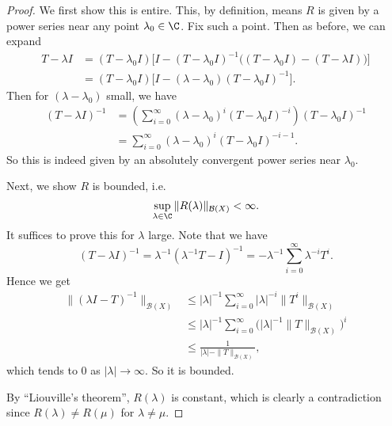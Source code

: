 \documentclass[a4paper]{article}
\begin{document}
\begin{proof}
  We first show this is entire. This, by definition, means $R$ is given by a power series near any point $\lambda_0 \in \C$. Fix such a point. Then as before, we can expand
  \begin{align*}
    T - \lambda I &= (T - \lambda_0 I)\Big[I - (T - \lambda_0 I)^{-1} \Big((T - \lambda_0 I) - (T - \lambda I)\Big)\Big]\\
    &= (T - \lambda_0 I)\Big[I - (\lambda - \lambda_0)(T - \lambda_0 I)^{-1}\Big].
  \end{align*}
  Then for $(\lambda - \lambda_0)$ small, we have
  \begin{align*}
    (T - \lambda I)^{-1} &= \left(\sum_{i = 0}^\infty (\lambda - \lambda_0)^i (T - \lambda_0 I)^{-i}\right) (T - \lambda_0 I)^{-1}\\
    &= \sum_{i = 0}^\infty (\lambda - \lambda_0)^i (T - \lambda_0I)^{-i - 1}.
  \end{align*}
  So this is indeed given by an absolutely convergent power series near $\lambda_0$.

  Next, we show $R$ is bounded, i.e.
  \[
    \sup_{\lambda \in \C} \|R (\lambda)\|_{\mathcal{B}(X)} < \infty.
  \]
  It suffices to prove this for $\lambda$ large. Note that we have
  \[
    (T - \lambda I)^{-1} = \lambda^{-1}(\lambda^{-1} T - I)^{-1} = -\lambda^{-1} \sum_{i = 0}^\infty \lambda^{-i} T^i.
  \]
  Hence we get
  \begin{align*}
    \|(\lambda I - T)^{-1}\|_{\mathcal{B}(X)} &\leq |\lambda|^{-1}\sum_{i = 0}^\infty |\lambda|^{-i} \|T^i\|_{\mathcal{B}(X)}\\
    &\leq |\lambda|^{-1} \sum_{i = 0}^\infty \big(|\lambda|^{-1} \|T\|_{\mathcal{B}(X)}\big)^i\\
    &\leq \frac{1}{|\lambda| - \|T\|_{\mathcal{B}(X)}},
  \end{align*}
  which tends to $0$ as $|\lambda| \to \infty$. So it is bounded.

  By ``Liouville's theorem'', $R(\lambda)$ is constant, which is clearly a contradiction since $R(\lambda) \not= R(\mu)$ for $\lambda \not= \mu$.
\end{proof}
\end{document}
